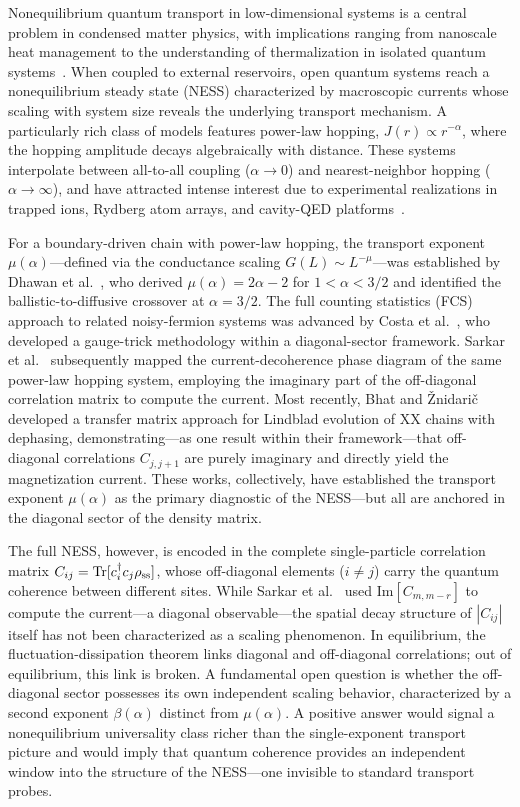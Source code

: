 \documentclass[aps,prd,twocolumn,superscriptaddress,floatfix]{revtex4-2}
\begin{document}
Nonequilibrium quantum transport in low-dimensional systems is a
central problem in condensed matter physics, with implications ranging
from nanoscale heat management to the understanding of thermalization
in isolated quantum systems~\cite{Breuer2002,Landi2022,Dhar2008,Lepri2003}.
When coupled to external reservoirs, open quantum systems reach a
nonequilibrium steady state (NESS) characterized by macroscopic
currents whose scaling with system size reveals the underlying
transport mechanism. A particularly rich class of models features
power-law hopping, $J(r) \propto r^{-\alpha}$, where the hopping
amplitude decays algebraically with distance. These systems
interpolate between all-to-all coupling ($\alpha \to 0$) and
nearest-neighbor hopping ($\alpha \to \infty$), and have attracted
intense interest due to experimental realizations in trapped ions,
Rydberg atom arrays, and cavity-QED
platforms~\cite{Breuer2002,Landi2022,Dhar2008,Lepri2003}.

For a boundary-driven chain with power-law hopping, the transport
exponent $\mu(\alpha)$---defined via the conductance scaling
$G(L) \sim L^{-\mu}$---was established by Dhawan et
al.~\cite{Dhawan2024}, who derived $\mu(\alpha)=2\alpha-2$ for
$1<\alpha<3/2$ and identified the ballistic-to-diffusive crossover at
$\alpha=3/2$. The full counting statistics (FCS) approach to related
noisy-fermion systems was advanced by Costa et
al.~\cite{Costa2025}, who developed a gauge-trick methodology within a
diagonal-sector framework. Sarkar et al.~\cite{Sarkar2024} subsequently
mapped the current-decoherence phase diagram of the same power-law
hopping system, employing the imaginary part of the off-diagonal
correlation matrix to compute the current. Most recently, Bhat and
\v{Z}nidari\v{c}~\cite{Bhat2025} developed a transfer matrix approach
for Lindblad evolution of XX chains with dephasing,
demonstrating---as one result within their framework---that
off-diagonal correlations $C_{j,j+1}$ are purely imaginary and
directly yield the magnetization current. These works, collectively,
have established the transport exponent $\mu(\alpha)$ as the primary
diagnostic of the NESS---but all are anchored in the diagonal sector
of the density matrix.

The full NESS, however, is encoded in the complete single-particle
correlation matrix $C_{ij} = \text{Tr}[c_i^\dagger c_j \rho_{\rm
ss}]$, whose off-diagonal elements ($i\neq j$) carry the quantum
coherence between different sites. While Sarkar et
al.~\cite{Sarkar2024} used $\text{Im}[C_{m,m-r}]$ to compute the
current---a diagonal observable---the spatial decay structure of
$|C_{ij}|$ itself has not been characterized as a scaling phenomenon.
In equilibrium, the fluctuation-dissipation theorem links diagonal and
off-diagonal correlations; out of equilibrium, this link is broken. A
fundamental open question is whether the off-diagonal sector possesses
its own independent scaling behavior, characterized by a second
exponent $\beta(\alpha)$ distinct from $\mu(\alpha)$. A positive
answer would signal a nonequilibrium universality class richer than
the single-exponent transport picture and would imply that quantum
coherence provides an independent window into the structure of the
NESS---one invisible to standard transport probes.
\end{document}
